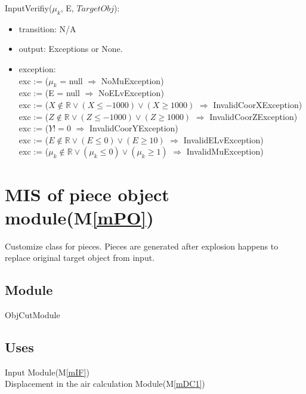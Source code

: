 \documentclass[12pt, titlepage]{article}
\newcommand{\mref}[1]{M\ref{#1}}
\begin{document}
\noindent InputVerifiy($\mu_{k}$, E, $TargetObj$):  
\begin{itemize}
\item transition: N/A
\item output: Exceptions or None.
\item exception:\\
exc := ($\mu_{k}$ = null $\Rightarrow $ NoMuException)\\
exc := (E = null $\Rightarrow $ NoELvException)\\
exc := ($X \notin \mathbb{R} \vee (X \le -1000) \vee (X \ge 1000)$ $\Rightarrow $ InvalidCoorXException)\\
exc := ($Z \notin \mathbb{R} \vee (Z \le -1000) \vee (Z \ge 1000)$ $\Rightarrow $ InvalidCoorZException)\\
exc := ($Y != 0$ $\Rightarrow $ InvalidCoorYException)\\
exc := ($E \notin \mathbb{R} \vee (E \leq 0) \vee (E \geq 10)$ $\Rightarrow $ InvalidELvException)\\
exc := ($\mu_{k} \notin \mathbb{R} \vee (\mu_{k} \le 0) \vee (\mu_{k} \ge 1)$ $\Rightarrow $ InvalidMuException)\\
\end{itemize}

\section{MIS of piece object module(\mref{mPO})}

Customize class for pieces. Pieces are generated after explosion happens to replace original target object from input.

\subsection{Module}

ObjCutModule

\subsection{Uses}

Input Module(\mref{mIF})\\
Displacement in the air calculation Module(\mref{mDC1})\\ 
\end{document}
